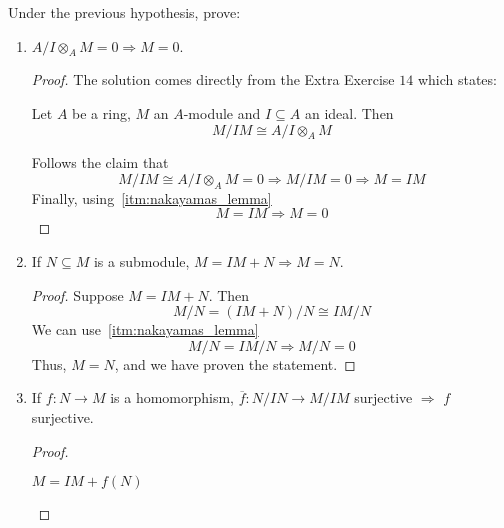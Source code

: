 \begin{problem}
    Under the previous hypothesis, prove:
    \begin{enumerate}[label=(\theproblem.\arabic*),ref=\theproblem.\arabic*]
        \item \label{itm:2_1} $A/I \otimes_A M = 0 \Rightarrow M = 0$.
            \begin{sol}
                \begin{proof}
                    The solution comes directly from the Extra Exercise $14$ which states:
                    \begin{claim}
                        Let $A$ be a ring, $M$ an $A$-module and $I \subseteq A$ an ideal.
                        Then
                        \[
                            M/IM \cong A/I \otimes_A M
                        \]
                    \end{claim}
                    Follows the claim that
                    \[
                        M/IM \cong A/I \otimes_A M = 0 \Rightarrow M/IM = 0 \Rightarrow M = IM
                    \]
                    Finally, using~\ref{itm:nakayamas_lemma}
                    \[
                        M = IM \Rightarrow M = 0
                    \]
                \end{proof}
            \end{sol}
        \item \label{itm:2_2} If $N \subseteq M$ is a submodule, $M = IM + N \Rightarrow M = N$.
            \begin{sol}
                \begin{proof}
                    Suppose $M = IM + N$.
                    Then
                    \[
                        M / N = (IM + N) / N \cong IM / N
                    \]
                    We can use~\ref{itm:nakayamas_lemma}
                    \[
                        M/N = IM/N \Rightarrow M/N = 0
                    \]
                    Thus, $M = N$, and we have proven the statement.
                \end{proof}
            \end{sol}
        \item If $f: N \rightarrow M$ is a homomorphism, $\overline{f}: N/IN \rightarrow M/IM$ surjective $\Rightarrow$ $f$
        surjective.
            \begin{sol}
                \begin{proof}
                    \begin{claim}
                        $M = IM + f(N)$

\end{claim}
\end{proof}
\end{sol}
\end{enumerate}
\end{problem}
